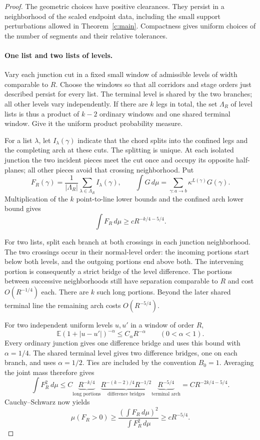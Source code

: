 \begin{proof}
The geometric choices have positive clearances. They persist in a
neighborhood of the scaled endpoint data, including the small support
perturbations allowed in Theorem~\ref{c:main}. Compactness gives uniform
choices of the number of segments and their relative tolerances.

\paragraph{One list and two lists of levels.}
Vary each junction cut in a fixed small window of admissible levels of
width comparable to $R$. Choose the windows so that all corridors and
stage orders just described persist for every list. The terminal level
is shared by the two branches; all other levels vary independently.
If there are $k$ legs in total, the set $\Lambda_R$ of level lists is
thus a product of $k-2$ ordinary windows and one shared terminal window.
Give it the uniform product probability measure.

For a list $\lambda$, let $I_\lambda(\gamma)$ indicate that the chord
splits into the confined legs and the completing arch at these cuts.
The splitting is unique. At each isolated junction the two incident
pieces meet the cut once and occupy its opposite half-planes; all other
pieces avoid that crossing neighborhood. Put
\[
 F_R(\gamma)=\frac1{|\Lambda_R|}\sum_{\lambda\in\Lambda_R}I_\lambda(\gamma),
 \qquad
 \int G\,d\mu=\sum_{\gamma:a\to b}\kappa^{L(\gamma)}G(\gamma).
\]
Multiplication of the $k$ point-to-line lower bounds and the confined
arch lower bound gives
\[
 \int F_R\,d\mu\ge cR^{-k/4-5/4}.
\]

For two lists, split each branch at both crossings in each junction
neighborhood. The two crossings occur in their normal-level order:
the incoming portions start below both levels, and the outgoing
portions end above both. The intervening portion is consequently a
strict bridge of the level difference. The portions between successive
neighborhoods still have separation comparable to $R$ and cost
$O(R^{-1/4})$ each. There are $k$ such long portions. Beyond the later
shared terminal line the remaining arch costs $O(R^{-5/4})$.

For two independent uniform levels $u,u'$ in a window of order $R$,
\[
 \mathbb E(1+|u-u'|)^{-\alpha}\le C_\alpha R^{-\alpha}
 \qquad(0<\alpha<1).
\]
Every ordinary junction gives one difference bridge and uses this bound
with $\alpha=1/4$. The shared terminal level gives two difference
bridges, one on each branch, and uses $\alpha=1/2$. Ties are included
by the convention $B_0=1$. Averaging the joint mass therefore gives
\[
 \int F_R^2\,d\mu
 \le C\underbrace{R^{-k/4}}_{\text{long portions}}
       \underbrace{R^{-(k-2)/4}R^{-1/2}}_{\text{difference bridges}}
       \underbrace{R^{-5/4}}_{\text{terminal arch}}
 =CR^{-2k/4-5/4}.
\]
Cauchy--Schwarz now yields
\[
 \mu(F_R>0)\ge
 \frac{(\int F_R\,d\mu)^2}{\int F_R^2\,d\mu}
 \ge cR^{-5/4}.
\]


\end{proof}
